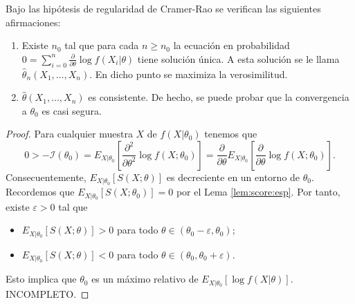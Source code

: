     \begin{thm}
        Bajo las hipótesis de regularidad de Cramer-Rao se verifican las siguientes afirmaciones:
        \begin{enumerate}
            \item Existe $n_0$ tal que para cada $n \ge n_0$ la ecuación en probabilidad $0 =\sum_{i=0}^n \frac{\partial}{\partial \theta} \log f(X_i | \theta)$ tiene solución única. A esta solución se le llama $\hat{\theta}_n(X_1, \ldots, X_n)$. En dicho punto se maximiza la verosimilitud.
            \item $\hat{\theta}(X_1, \ldots, X_n)$ es consistente. De hecho, se puede probar que la convergencia a $\theta_0$ es casi segura.
        \end{enumerate}
    \end{thm}
    \begin{proof}
        Para cualquier muestra $X$ de $f(X|\theta_0)$ tenemos que
        \[0 > -\mathcal{I}(\theta_0)=E_{X|\theta_0}\left[ \frac{\partial^2}{\partial\theta^2} \log f(X;\theta_0)\right] = \frac{\partial}{\partial\theta} E_{X|\theta_0} \left[ \frac{\partial}{\partial\theta} \log f(X;\theta_0) \right].\]
        Consecuentemente, $E_{X|\theta_0} \left[ S(X; \theta) \right]$ es decreciente en un entorno de $\theta_0$. Recordemos que $E_{X|\theta_0} \left[ S(X; \theta_0) \right] = 0$ por el Lema \ref{lem:score:esp}. Por tanto, existe $\varepsilon > 0$ tal que
        \begin{itemize}
            \item $E_{X|\theta_0} \left[ S(X; \theta) \right] > 0$ para todo $\theta \in (\theta_0 - \varepsilon, \theta_0)$;
            \item $E_{X|\theta_0} \left[ S(X; \theta) \right] < 0$ para todo $\theta \in (\theta_0, \theta_0 + \varepsilon)$.
        \end{itemize}
        Esto implica que $\theta_0$ es un máximo relativo de $E_{X|\theta_0}[\log f(X|\theta)]$.
        INCOMPLETO.
    \end{proof}

